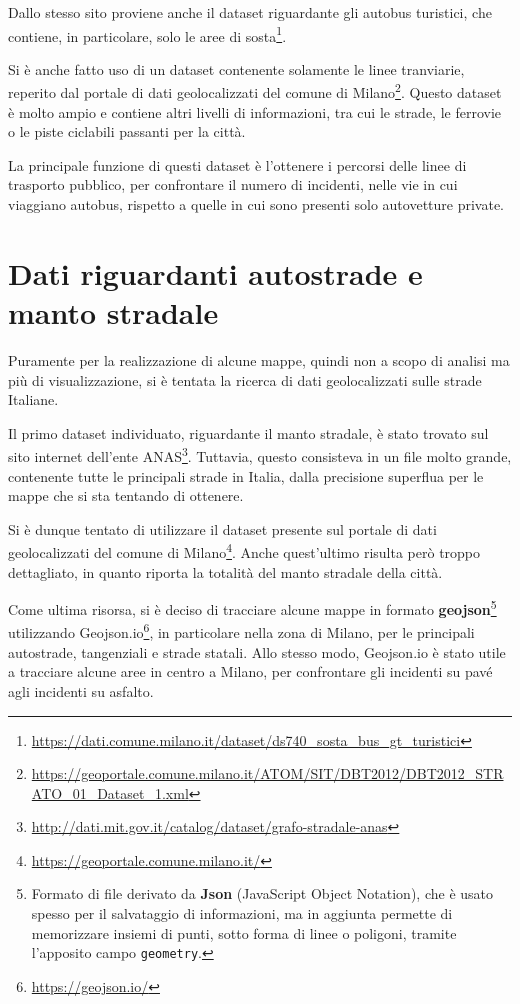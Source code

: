\documentclass[a4paper,12pt]{report}
\newcommand{\columnstyle}[1]{\texttt{#1}}
\begin{document}
Dallo stesso sito proviene anche il dataset riguardante gli autobus turistici, che 
contiene, in particolare, solo le aree di 
sosta\footnote{\url{https://dati.comune.milano.it/dataset/ds740_sosta_bus_gt_turistici}}. 

Si è anche fatto uso di un dataset contenente 
solamente le linee tranviarie, reperito dal portale di dati geolocalizzati 
del comune di 
Milano\footnote{\url{https://geoportale.comune.milano.it/ATOM/SIT/DBT2012/DBT2012_STRATO_01_Dataset_1.xml}}. 
Questo dataset è molto ampio e contiene altri livelli di informazioni, tra cui 
le strade, le ferrovie o le piste ciclabili passanti per la città. 

La principale funzione di questi dataset è l'ottenere i percorsi delle linee di trasporto pubblico, 
per confrontare il numero di incidenti, nelle vie in cui viaggiano autobus, rispetto a 
quelle in cui sono presenti solo autovetture private. 

\section{Dati riguardanti autostrade e manto stradale}

Puramente per la realizzazione di alcune mappe, quindi non a scopo di analisi 
ma più di visualizzazione, si è tentata la ricerca di dati geolocalizzati sulle 
strade Italiane. 

Il primo dataset individuato, riguardante il manto  stradale, è stato trovato sul sito 
internet dell'ente  
ANAS\footnote{\url{http://dati.mit.gov.it/catalog/dataset/grafo-stradale-anas}}. 
Tuttavia, questo consisteva in un file molto grande, contenente tutte le principali 
strade in Italia, dalla precisione superflua per le mappe che si sta tentando di ottenere. 

Si è dunque tentato di utilizzare il dataset presente sul portale di dati geolocalizzati 
del comune di Milano\footnote{\url{https://geoportale.comune.milano.it/}}. 
Anche quest'ultimo risulta però troppo dettagliato, in quanto riporta la 
totalità del manto stradale della città. 

Come ultima risorsa, si è deciso di tracciare alcune mappe in formato 
\textbf{geojson}\footnote{Formato di file derivato da \textbf{Json} 
(JavaScript Object Notation), che è usato spesso per il salvataggio di informazioni, ma 
in aggiunta permette di memorizzare insiemi di punti, sotto forma di linee o poligoni, 
tramite l'apposito campo \columnstyle{geometry}.} utilizzando 
Geojson.io\footnote{\url{https://geojson.io/}}, in particolare nella zona di Milano, 
per le principali autostrade, tangenziali e strade statali. 
Allo stesso modo, Geojson.io è stato utile a tracciare alcune aree in centro a Milano, 
per confrontare gli incidenti su pavé agli incidenti su asfalto. 
\end{document}
